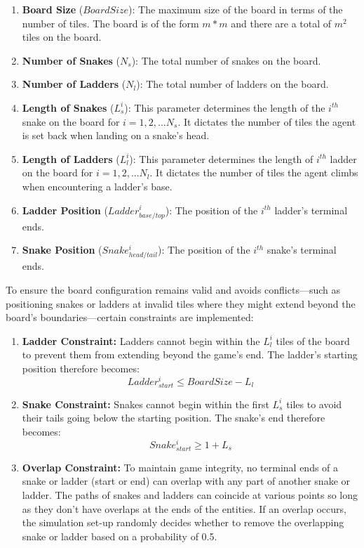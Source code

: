 \documentclass[12pt]{report}
\begin{document}
	\begin{enumerate}
		\item \textbf{Board Size }($BoardSize$): The maximum size of the board in terms of the number of tiles. The board is of the form $m * m$ and there are a total of $m^2$ tiles on the board.
		\item \textbf{Number of Snakes} ($N_{s}$): The total number of snakes on the board.
		\item \textbf{ Number of Ladders } ($N_{l}$): The total number of ladders on the board.
		\item \textbf{Length of Snakes }($L^{i}_{s}$): This parameter determines the length of the $i^{th}$ snake on the board for $i=1,2,... N_{s}$. It dictates the number of tiles the agent is set back when landing on a snake's head.
		\item \textbf{Length of Ladders} ($L^{i}_{l}$): This parameter determines the length of $i^{th}$ ladder on the board for $i=1,2,... N_{l}$. It dictates the number of tiles the agent climbs when encountering a ladder's base.
		\item \textbf{Ladder Position} ($Ladder^{i}_{base/top}$): The position of the $i^{th}$ ladder's terminal ends.
		\item \textbf{Snake Position} ($Snake^{i}_{head/tail}$): The position of the $i^{th}$ snake's terminal ends.
	\end{enumerate}
	
	To ensure the board configuration remains valid and avoids conflicts—such as positioning snakes or ladders at invalid tiles where they might extend beyond the board's boundaries—certain constraints are implemented:
	
	\begin{enumerate}
		\item \textbf{Ladder Constraint:} Ladders cannot begin within the $L^{i}_{l}$ tiles of the board to prevent them from extending beyond the game's end. The ladder's starting position therefore becomes:  $$Ladder^{i}_{start} \leq BoardSize - L_{l}$$
		\item \textbf{Snake Constraint:} Snakes cannot begin within the first $L^{i}_{s}$ tiles to avoid their tails going below the starting position. The snake's end therefore becomes: $$Snake^{i}_{start}\geq 1 + L_{s}$$
		\item \textbf{Overlap Constraint:} To maintain game integrity, no terminal ends of a snake or ladder (start or end) can overlap with any part of another snake or ladder. The paths of snakes and ladders can coincide at various points so long as they don't have overlaps at the ends of the entities. If an overlap occurs, the simulation set-up randomly decides whether to remove the overlapping snake or ladder based on a probability of 0.5.
	\end{enumerate}
	
\end{document}
